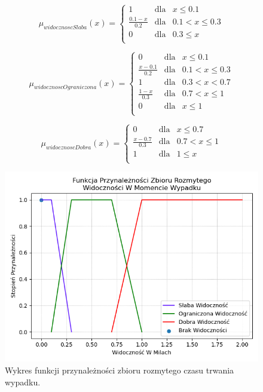 \documentclass{classrep}
\begin{document}
\begin{equation}
\mu _{widocznoscSlaba}(x) =  \left\{ \begin{array}{rcl}
 1 & \mbox{dla} & x  \leq 0.1 \\
\frac{0.1 - x}{0.2} & \mbox{dla} & 0.1 < x \leq 0.3\\
0 & \mbox{dla} & 0.3 \leq x\\
\end{array}\right.
\end{equation}

\begin{equation}
\mu _{widocznoscOgraniczona}(x) =  \left\{ \begin{array}{rcl}
 0 & \mbox{dla} & x  \leq 0.1 \\
\frac{x - 0.1}{0.2} & \mbox{dla} & 0.1 < x \leq 0.3\\
1 & \mbox{dla} & 0.3 < x < 0.7\\
\frac{1 - x}{0.3} & \mbox{dla} & 0.7 < x \leq1\\
 0 & \mbox{dla} & x  \leq 1 \\
\end{array}\right.
\end{equation}

\begin{equation}
\mu _{widocznoscDobra}(x) =  \left\{ \begin{array}{rcl}
 0 & \mbox{dla} & x \leq 0.7 \\
\frac{x - 0.7}{0.3} & \mbox{dla} & 0.7 < x \leq 1\\
1 & \mbox{dla} & 1 \leq x\\
\end{array}\right.
\end{equation}

\begin{figure}[h!]
 \centering
 \includegraphics[width=14cm]{FunkcjaPrzynaleznosciWidocznosc.png}
 \vspace{-0.3cm}
 \caption{Wykres funkcji przynależności zbioru rozmytego czasu trwania wypadku. }
 \label{rysunek do eksperymentu 1 wariantu 1}
\end{figure}
\newpage
\end{document}

